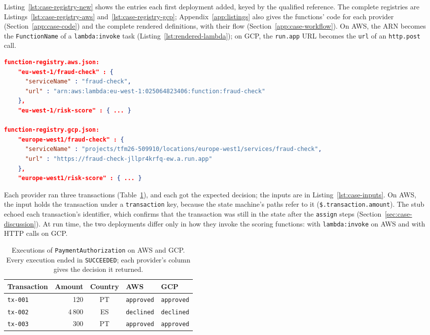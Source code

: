 Listing~\ref{lst:case-registry-new} shows the entries each first deployment added, keyed by the
qualified reference. The complete registries are Listings~\ref{lst:case-registry-aws}
and~\ref{lst:case-registry-gcp}; Appendix~\ref{app:listings} also gives the functions' code for
each provider (Section~\ref{app:case-code}) and the complete rendered definitions, with their flow
(Section~\ref{app:case-workflow}). On AWS, the ARN becomes the \texttt{FunctionName} of a
\texttt{lambda:invoke} task (Listing~\ref{lst:rendered-lambda}); on GCP, the \texttt{run.app} URL
becomes the \texttt{url} of an \texttt{http.post} call.

\begin{lstlisting}[language=json,caption={Registry entries added by the first deployment of \texttt{PaymentAuthorization} on AWS and GCP (excerpts of Listings~\ref{lst:case-registry-aws} and~\ref{lst:case-registry-gcp}).},label={lst:case-registry-new},float=htbp,basicstyle=\ttfamily\fontsize{7.2}{8.6}\selectfont,breaklines=false]
function-registry.aws.json:
    "eu-west-1/fraud-check" : {
      "serviceName" : "fraud-check",
      "url" : "arn:aws:lambda:eu-west-1:025064823406:function:fraud-check"
    },
    "eu-west-1/risk-score" : { ... }

function-registry.gcp.json:
    "europe-west1/fraud-check" : {
      "serviceName" : "projects/tfm26-509910/locations/europe-west1/services/fraud-check",
      "url" : "https://fraud-check-jllpr4krfq-ew.a.run.app"
    },
    "europe-west1/risk-score" : { ... }
\end{lstlisting}

Each provider ran three transactions (Table~\ref{tab:case-executions}), and each got the expected
decision; the inputs are in Listing~\ref{lst:case-inputs}. On AWS, the input holds the transaction
under a \texttt{transaction} key, because the state machine's paths refer to it
(\texttt{\$.transaction.amount}). The stub echoed each transaction's identifier, which confirms
that the transaction was still in the state after the \texttt{assign} steps
(Section~\ref{sec:case-discussion}). At run time, the two deployments differ only in how they
invoke the scoring functions: with \texttt{lambda:invoke} on AWS and with HTTP calls on GCP.

\begin{table}[tbp]
  \centering
  \caption{Executions of \texttt{PaymentAuthorization} on AWS and GCP. Every execution ended in
  \texttt{SUCCEEDED}; each provider's column gives the decision it returned.}
  \label{tab:case-executions}
  \begin{tabular}{|l|r|c|l|l|}
    \hline
    \textbf{Transaction} & \textbf{Amount} & \textbf{Country} & \textbf{AWS} & \textbf{GCP} \\
    \hline
    \texttt{tx-001} & 120  & PT & \texttt{approved} & \texttt{approved} \\
    \hline
    \texttt{tx-002} & 4\,800 & ES & \texttt{declined} & \texttt{declined} \\
    \hline
    \texttt{tx-003} & 300  & PT & \texttt{approved} & \texttt{approved} \\
    \hline
  \end{tabular}
\end{table}

